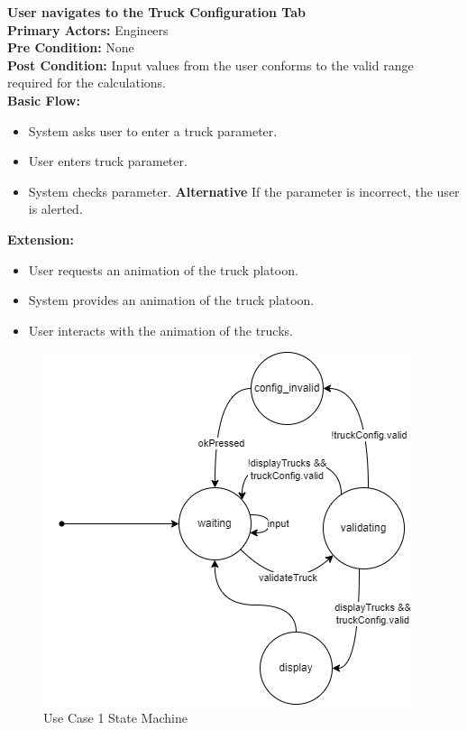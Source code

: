 \documentclass[12pt]{article}
\begin{document}
\noindent
\textbf{User navigates to the Truck Configuration Tab} \\
\textbf{  Primary Actors:} Engineers\\
\textbf{  Pre Condition:} None\\
\textbf{  Post Condition:} Input values from the user conforms to the valid range required for the calculations.\\ 
\textbf{  Basic Flow:} 
\begin{itemize}
\item System asks user to enter a truck parameter.
\item User enters truck parameter.
\item System checks parameter.
\subitem \textbf{Alternative} If the parameter is incorrect, the user is alerted.
\end{itemize}
\textbf{  Extension:}
\begin{itemize}
\item User requests an animation of the truck platoon.
\item System provides an animation of the truck platoon.
\item User interacts with the animation of the trucks. 
\end{itemize}
\begin{figure}[H]
  \centering
  \includegraphics[width=0.5\linewidth]{use-case-1-sm.png}
  \caption{Use Case 1 State Machine}
  \label {fig:use-case-1-sm}
\end{figure}
\end{document}
